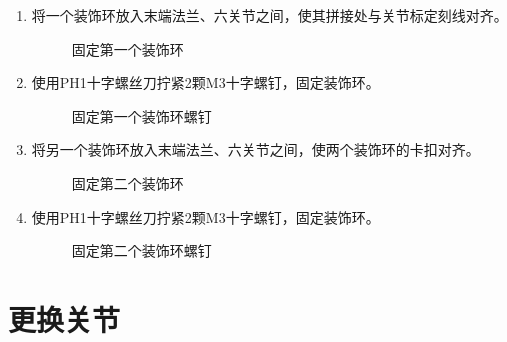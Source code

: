 \documentclass[a4paper,11pt,english,openany,oneside]{sphinxmanual}
\begin{document}
\begin{enumerate}
\item {} 
\sphinxAtStartPar
将一个装饰环放入末端法兰、六关节之间，使其拼接处与关节标定刻线对齐。

\begin{figure}[H]
\centering
\capstart

\noindent{}
\caption{固定第一个装饰环}\label{\detokenize{_u66f4_u6362_u672b_u7aef_u6cd5_u5170:id32}}\end{figure}

\item {} 
\sphinxAtStartPar
使用PH1十字螺丝刀拧紧2颗M3十字螺钉，固定装饰环。

\begin{figure}[H]
\centering
\capstart

\noindent{}
\caption{固定第一个装饰环螺钉}\label{\detokenize{_u66f4_u6362_u672b_u7aef_u6cd5_u5170:id33}}\end{figure}

\item {} 
\sphinxAtStartPar
将另一个装饰环放入末端法兰、六关节之间，使两个装饰环的卡扣对齐。

\begin{figure}[H]
\centering
\capstart

\noindent{}
\caption{固定第二个装饰环}\label{\detokenize{_u66f4_u6362_u672b_u7aef_u6cd5_u5170:id34}}\end{figure}

\item {} 
\sphinxAtStartPar
使用PH1十字螺丝刀拧紧2颗M3十字螺钉，固定装饰环。

\begin{figure}[H]
\centering
\capstart

\noindent{}
\caption{固定第二个装饰环螺钉}\label{\detokenize{_u66f4_u6362_u672b_u7aef_u6cd5_u5170:id35}}\end{figure}

\end{enumerate}

\sphinxstepscope


\section{更换关节}
\label{\detokenize{_u66f4_u6362_u5173_u8282:id1}}\label{\detokenize{_u66f4_u6362_u5173_u8282:id2}}\label{\detokenize{_u66f4_u6362_u5173_u8282::doc}}
\end{document}
